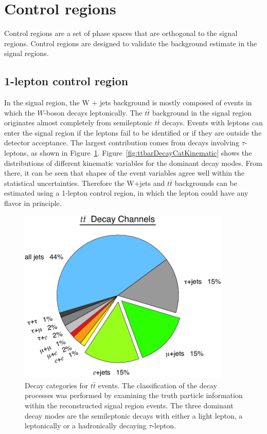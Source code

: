 \section{Control regions}
\label{sec:ana-sig:ctlreg}
\par Control regions are a set of phase spaces that are orthogonal to the signal regions. 
Control regions are designed to validate the background estimate in the signal regions.

\subsection{1-lepton control region}
\par In the signal region, the W + jets background is mostly composed of events in which the $W$-boson decays leptonically. 
The $t\bar{t}$ background in the signal region originates almost completely from semileptonic $t\bar{t}$ decays. 
Events with leptons can enter the signal region if the leptons fail to be identified or if they are outside the detector acceptance. 
The largest contribution comes from decays involving $\tau$-leptons, as shown in Figure~\ref{fig:ttbarDecayCat}. 
Figure~\ref{fig:ttbarDecayCatKinematic} shows the distributions of different kinematic variables for the dominant decay modes. 
From there, it can be seen that shapes of the event variables agree well within the statistical uncertainties. 
Therefore the W+jets and $t\bar{t}$ backgrounds can be estimated using a 1-lepton control region, in which the lepton could have any flavor in principle.

\begin{figure}[h]
    \centering
    \includegraphics[width=0.9\textwidth]{chapters/c7/figures/ttbar-decay-modes.png}
    \caption{Decay categories for $t\bar{t}$ events. The classification of the decay processes was performed by examining the truth particle information within the reconstructed signal region events. The three dominant decay modes are the semileptonic decays with either a light lepton, a leptonically or a hadronically decaying $\tau$-lepton.}
    \label{fig:ttbarDecayCat}
\end{figure}

